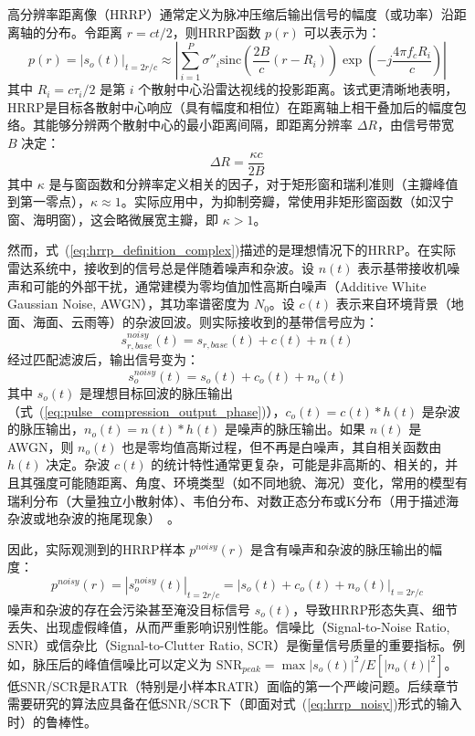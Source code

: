 高分辨率距离像（HRRP）通常定义为脉冲压缩后输出信号的幅度（或功率）沿距离轴的分布。令距离 $r = ct/2$，则HRRP函数 $p(r)$ 可以表示为：
\begin{equation}
    p(r) = |s_o(t)|_{t=2r/c} \approx \left| \sum_{i=1}^{P} \sigma''_i \text{sinc}\left(\frac{2B}{c}(r - R_i)\right) \exp(-j \frac{4\pi f_c R_i}{c}) \right|
    \label{eq:hrrp_definition_complex}
\end{equation}
其中 $R_i = c\tau_i/2$ 是第 $i$ 个散射中心沿雷达视线的投影距离。该式更清晰地表明，HRRP是目标各散射中心响应（具有幅度和相位）在距离轴上相干叠加后的幅度包络。其能够分辨两个散射中心的最小距离间隔，即距离分辨率 $\Delta R$，由信号带宽 $B$ 决定：
\begin{equation}
    \Delta R = \frac{\kappa c}{2B}
    \label{eq:range_resolution_kappa}
\end{equation}
其中 $\kappa$ 是与窗函数和分辨率定义相关的因子，对于矩形窗和瑞利准则（主瓣峰值到第一零点），$\kappa \approx 1$。实际应用中，为抑制旁瓣，常使用非矩形窗函数（如汉宁窗、海明窗），这会略微展宽主瓣，即 $\kappa > 1$。

然而，式~(\ref{eq:hrrp_definition_complex})描述的是理想情况下的HRRP。在实际雷达系统中，接收到的信号总是伴随着噪声和杂波。设 $n(t)$ 表示基带接收机噪声和可能的外部干扰，通常建模为零均值加性高斯白噪声（Additive White Gaussian Noise, AWGN），其功率谱密度为 $N_0$。设 $c(t)$ 表示来自环境背景（地面、海面、云雨等）的杂波回波。则实际接收到的基带信号应为：
\begin{equation}
    s_{r,base}^{noisy}(t) = s_{r,base}(t) + c(t) + n(t)
    \label{eq:received_noisy}
\end{equation}
经过匹配滤波后，输出信号变为：
\begin{equation}
    s_o^{noisy}(t) = s_o(t) + c_o(t) + n_o(t)
    \label{eq:output_noisy}
\end{equation}
其中 $s_o(t)$ 是理想目标回波的脉压输出（式~(\ref{eq:pulse_compression_output_phase})），$c_o(t) = c(t) * h(t)$ 是杂波的脉压输出，$n_o(t) = n(t) * h(t)$ 是噪声的脉压输出。如果 $n(t)$ 是AWGN，则 $n_o(t)$ 也是零均值高斯过程，但不再是白噪声，其自相关函数由 $h(t)$ 决定。杂波 $c(t)$ 的统计特性通常更复杂，可能是非高斯的、相关的，并且其强度可能随距离、角度、环境类型（如不同地貌、海况）变化，常用的模型有瑞利分布（大量独立小散射体）、韦伯分布、对数正态分布或K分布（用于描述海杂波或地杂波的拖尾现象）~\cite{X}。

因此，实际观测到的HRRP样本 $p^{noisy}(r)$ 是含有噪声和杂波的脉压输出的幅度：
\begin{equation}
    p^{noisy}(r) = |s_o^{noisy}(t)|_{t=2r/c} = |s_o(t) + c_o(t) + n_o(t)|_{t=2r/c}
    \label{eq:hrrp_noisy}
\end{equation}
噪声和杂波的存在会污染甚至淹没目标信号 $s_o(t)$，导致HRRP形态失真、细节丢失、出现虚假峰值，从而严重影响识别性能。信噪比（Signal-to-Noise Ratio, SNR）或信杂比（Signal-to-Clutter Ratio, SCR）是衡量信号质量的重要指标。例如，脉压后的峰值信噪比可以定义为 $\text{SNR}_{peak} = \max |s_o(t)|^2 / E[|n_o(t)|^2]$。低SNR/SCR是RATR（特别是小样本RATR）面临的第一个严峻问题。后续章节需要研究的算法应具备在低SNR/SCR下（即面对式~(\ref{eq:hrrp_noisy})形式的输入时）的鲁棒性。

